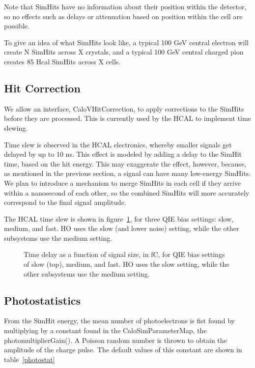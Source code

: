 \documentclass{cmspaper}
\begin{document}
Note that SimHits have no information about their position
within the detector, so no effects such as delays or attenuation
based on position within the cell are possible.

To give an idea of what SimHits look like, a typical 100 GeV central electron
will create N SimHits across X crystals, and a typical 100 GeV central charged
pion creates 85 Hcal SimHits across X cells.


\subsection{Hit Correction}

We allow an interface, CaloVHitCorrection, to apply corrections to the SimHits before
they are processed.  This is currently used by the HCAL to implement
time slewing.  

Time slew is observed in the HCAL electronics, whereby smaller signals get delayed
by up to 10 ns.  This effect is modeled by adding a delay to the SimHit time,
based on the hit energy.  This may exaggerate the effect, however,
because, as mentioned in the previous section, a signal can have many low-energy
SimHits.  We plan to introduce a mechanism to merge SimHits in 
each cell if they arrive within a nanosecond of each other, so the
combined SimHits will more accurately correspond to the final
signal amplitude.

The HCAL time slew is shown in figure~\ref{fig:slew}, for three QIE bias settings: slow, medium, and fast.  HO uses the slow (and lower noise) setting, while the other subsystems use the medium setting.

\begin{figure}[hbtp]
  \begin{center}
    \caption{Time delay as a function of signal size, in fC, for QIE bias settings of slow (top), medium, and fast.  HO uses the slow setting, while the other subsystems use the medium setting.}
    \label{fig:slew}
  \end{center}
\end{figure}

\subsection{Photostatistics}

From the SimHit energy, the mean number of photoelectrons is
fist found by multiplying by a constant found in the CaloSimParameterMap, the photomultiplierGain().
A Poisson random number is thrown to obtain the amplitude of 
the charge pulse.  The default values of this constant are shown
in table~\ref{photostat}
\end{document}
